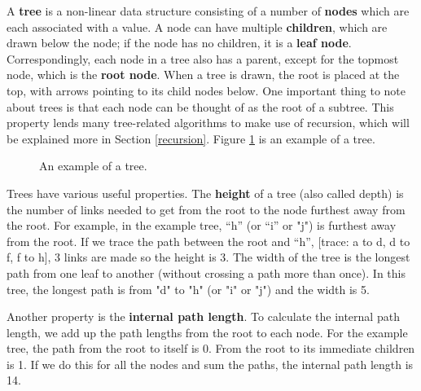A \textbf{tree} is a non-linear data structure consisting of a number of \textbf{nodes} which are each associated with a value. A node can have multiple \textbf{children}, which are drawn below the node; if the node has no children, it is a \textbf{leaf node}. Correspondingly, each node in a tree also has a parent, except for the topmost node, which is the \textbf{root node}. When a tree is drawn, the root is placed at the top, with arrows pointing to its child nodes below. One important thing to note about trees is that each node can be thought of as the root of a subtree. This property lends many tree-related algorithms to make use of recursion, which will be explained more in Section \ref{recursion}. Figure \ref{fig:tree0} is an example of a tree. 

\begin{figure}[h]
\centering
{}
\caption{An example of a tree.}
\label{fig:tree0}
\end{figure}


Trees have various useful properties. The \textbf{height} of a tree (also called depth) is the number of links needed to get from the root to the node furthest away from the root. For example, in the example tree, “h” (or “i” or "j") is furthest away from the root. If we trace the path between the root and “h”, [trace: a to d, d to f, f to h], 3 links are made so the height is 3. The width of the tree is the longest path from one leaf to another (without crossing a path more than once). In this tree, the longest path is from "d" to "h" (or "i" or "j") and the width is 5. 

Another property is the \textbf{internal path length}. To calculate the internal path length, we add up the path lengths from the root to each node. For the example tree, the path from the root to itself is 0. From the root to its immediate children is 1. If we do this for all the nodes and sum the paths, the internal path length is 14. 

